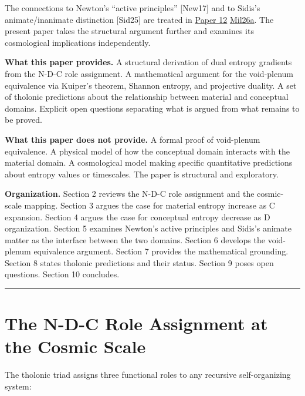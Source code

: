 \documentclass[12pt]{article}
\begin{document}
The connections to Newton's ``active principles'' {[}New17{]} and to
Sidis's animate/inanimate distinction {[}Sid25{]} are treated in
\href{https://github.com/baardev/truevalue/blob/main/docnav/Research/papers/12_newton-tholonic-framework/12_newton-tholonic-framework.pdf}{Paper
12}
\href{https://github.com/baardev/truevalue/blob/main/docnav/Research/papers/12_newton-tholonic-framework/12_newton-tholonic-framework.pdf}{Mil26a}.
The present paper takes the structural argument further and examines its
cosmological implications independently.

\textbf{What this paper provides.} A structural derivation of dual
entropy gradients from the N-D-C role assignment. A mathematical
argument for the void-plenum equivalence via Kuiper's theorem, Shannon
entropy, and projective duality. A set of tholonic predictions about the
relationship between material and conceptual domains. Explicit open
questions separating what is argued from what remains to be proved.

\textbf{What this paper does not provide.} A formal proof of void-plenum
equivalence. A physical model of how the conceptual domain interacts
with the material domain. A cosmological model making specific
quantitative predictions about entropy values or timescales. The paper
is structural and exploratory.

\textbf{Organization.} Section 2 reviews the N-D-C role assignment and
the cosmic-scale mapping. Section 3 argues the case for material entropy
increase as C expansion. Section 4 argues the case for conceptual
entropy decrease as D organization. Section 5 examines Newton's active
principles and Sidis's animate matter as the interface between the two
domains. Section 6 develops the void-plenum equivalence argument.
Section 7 provides the mathematical grounding. Section 8 states tholonic
predictions and their status. Section 9 poses open questions. Section 10
concludes.

\begin{center}\rule{0.5\linewidth}{0.5pt}\end{center}

\section{The N-D-C Role Assignment at the Cosmic Scale}\label{the-n-d-c-role-assignment-at-the-cosmic-scale}

The tholonic triad assigns three functional roles to any recursive
self-organizing system:
\end{document}
